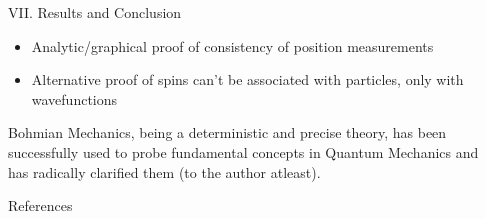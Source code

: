 \documentclass[final,hyperref={pdfpagelabels=false}]{beamer}
\begin{document}
\begin{frame}[t]
\begin{columns}[c]
\begin{column}{.69\textwidth}
\begin{columns}[b]
\begin{column}{.47\textwidth}
\begin{block}{VII. Results and Conclusion}
\begin{itemize}
{\begin{itemize}
                \item Analytic/graphical proof of consistency of position measurements
                \item Alternative proof of spins can't be associated with particles, only with wavefunctions
              \end{itemize}}
            \end{itemize}
            Bohmian Mechanics, being a deterministic and precise theory, has been successfully used to probe fundamental concepts in Quantum Mechanics and has radically clarified them (to the author atleast).

          \end{block}



          \begin{block}{References}
            \begin{multicols}{2}
            {\fontsize{20.5}{10}
              }
            \end{multicols}
          \end{block}



        \end{column}

        \begin{column}{.015\textwidth}\end{column} %
      \end{columns}

    \end{column}






\end{columns}
\end{frame}
\end{document}

